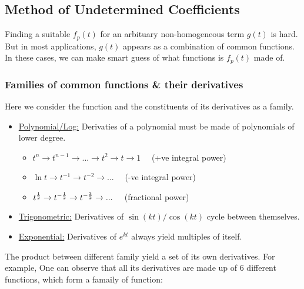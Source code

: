 \documentclass[class=article, crop=false, 12pt]{standalone}
\begin{document}
\subsection{Method of Undetermined Coefficients}

Finding a suitable $f_p(t)$ for an arbituary non-homogeneous term $g(t)$ is hard. 
But in most applications, $g(t)$ appears as a combination of common functions.
In these cases, we can make smart guess of what functions is $f_p(t)$ made of.

\subsubsection{Families of common functions \& their derivatives}

Here we consider the function and the constituents of its derivatives as a family.

\begin{itemize}
    \item \ul{Polynomial/Log:} Derivaties of a polynomial must be made of polynomials of lower degree.
    \begin{itemize}
        \item $t^n \to t^{n-1} \to ...\to t^2 \to t \to 1 \quad$ (+ve integral power)
        \item $\ln t \to t^{-1} \to t^{-2} \to ... \quad$ (-ve integral power)
        \item $t^{\frac{1}{2}} \to t^{-\frac{1}{2}} \to t^{-\frac{3}{2}} \to ...\quad $ (fractional power)
    \end{itemize}

    \item \ul{Trigonometric:} Derivatives of $\sin{(kt)}/\cos{(kt)}$ cycle between themselves.
    
    \item \ul{Exponential:} Derivatives of $e^{kt}$ always yield multiples of itself.
\end{itemize}

The product between different family yield a set of its own derivatives. For example,
One can observe that all its derivatives are made up of 6 different functions,
which form a famaily of function:
\end{document}
